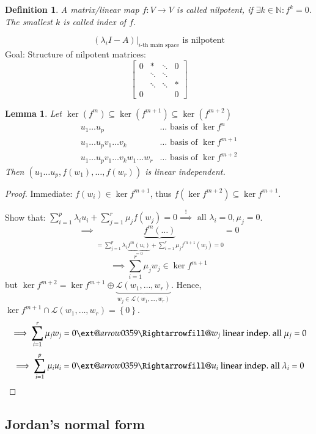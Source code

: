 \documentclass{article}
\makeatletter
\newcounter{lecref}[section]
\numberwithin{lecref}{section}
\newtheorem{definition}[lecref]{Definition}
\newtheorem{lemma}[lecref]{Lemma}
\newcommand{\set}[1]{\left\{#1\right\}}
\newcommand{\xRightarrow}[2][]{\ext@arrow 0359\Rightarrowfill@{#1}{#2}}
\makeatother
\begin{document}
\begin{definition} %
  A matrix/linear map $f: V \to V$ is called \emph{nilpotent}, if $\exists k \in \mathbb N: f^k = 0$.
  The smallest $k$ is called \emph{index} of $f$.
\end{definition}
\[ (\lambda_i I - A)|_{i\text{-th main space}} \text{ is nilpotent} \]
Goal: Structure of nilpotent matrices:
\[
  \begin{bmatrix}
    0 & * & \ddots & 0 \\
      & \ddots & \ddots & \\
      & \ddots & \ddots & * \\
    0 &  & & 0
  \end{bmatrix}
\]

\begin{lemma} %
  \label{lemma1117}
  Let $\ker(f^m) \subseteq \ker(f^{m+1}) \subseteq \ker(f^{m+2})$
  \begin{align*}
    u_1 \dots u_p & \dots \text{ basis of } \ker{f^n} \\
    u_1 \dots u_p v_1 \dots v_k & \dots \text{ basis of } \ker{f^{m+1}} \\
    u_1 \dots u_p v_1 \dots v_k w_1 \dots w_r & \dots \text{ basis of } \ker{f^{m+2}}
  \end{align*}
  Then $(u_1 \dots u_p, f(w_1), \dots, f(w_r))$ is linear independent.
\end{lemma}

\begin{proof}
  Immediate: $f(w_i) \in \ker{f^{m+1}}$, thus $f(\ker{f^{m+2}}) \subseteq \ker{f^{m+1}}$.

  Show that: $\sum_{i=1}^p \lambda_i u_i + \sum_{j=1}^r \mu_j f(w_j) = 0 \overset!\implies \text{ all } \lambda_i = 0, \mu_j = 0$.
  \[ \implies \underbrace{f^m(\dots)}_{= \sum_{j=1}^p \lambda_i \underbrace{f^m(u_i)}_{=0} + \sum_{i=1}^r \mu_j f^{m+1}(w_j) = 0} = 0 \]
  \[ \implies \sum_{i=1}^r \mu_j w_j \in \ker{f^{m+1}} \]
  but $\ker{f^{m+2}} = \ker{f^{m+1}} \oplus \underbrace{\mathcal L(w_1, \dots, w_r)}_{w_j \in \mathcal L(w_1, \dots, w_r)}$.
  Hence, $\ker{f^{m+1}} \cap \mathcal L(w_1, \dots, w_r) = \set{0}$.
  \[ \implies \sum_{i=1}^r \mu_j w_j = 0 \xRightarrow{w_j \text{ linear indep.}} \text{ all } \mu_j = 0 \]
  \[ \implies \sum_{i=1}^p \mu_i u_i = 0 \xRightarrow{u_i \text{ linear indep.}} \text{ all } \lambda_i = 0 \]
\end{proof}

\subsection{Jordan's normal form}
\end{document}
